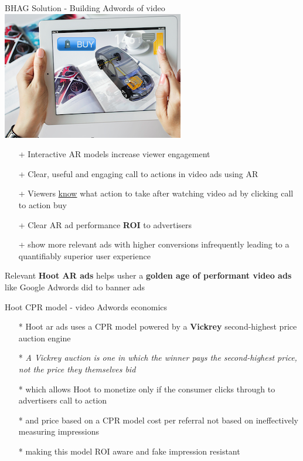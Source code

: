 \documentclass[12pt]{beamer}
\begin{document}
\begin{frame}[fragile]{BHAG Solution -  Building Adwords of video \includegraphics[scale=.1]{static/arad/arad5} }
\begin{itemize}
\item[+]Interactive AR models increase viewer engagement
\pause	
\item[+]Clear, useful and engaging call to actions in video ads using AR
\pause
\item[+]Viewers \underline{know} what action to take after watching video ad by clicking call to action buy 
\pause
\item[+]Clear AR ad performance \textbf{ROI} to advertisers 
\pause
\item[+]show more relevant ads with higher conversions infrequently leading to a quantifiably superior user experience 
\pause
\end{itemize}
Relevant \textbf{Hoot AR ads} helps usher a \textbf{golden age of performant video ads }like Google Adwords did to banner ads


\end{frame}

\begin{frame}[t]{Hoot CPR model - video Adwords economics}
\begin{itemize}
\item[*]Hoot ar ads uses a CPR model powered by a \textbf{Vickrey} second-highest price auction engine
\pause
\item[*]\emph{A Vickrey auction is one in which the winner pays the second-highest price, not the price they themselves bid}
\pause
\item[*]which allows Hoot to monetize only if the consumer clicks through to advertisers call to action
\pause
\item[*]and price based on a CPR model cost per referral not based on ineffectively measuring impressions
\item[*]making this model ROI aware and fake impression resistant
\end{itemize}
\end{frame}
\end{document}
